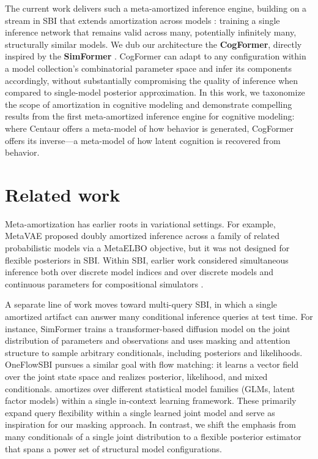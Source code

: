 The current work delivers such a meta-amortized inference engine, building on a stream in SBI that extends amortization across models \citep{chang2025amortized, gloeckler2024all, elsemuller2023sensitivity, schroder2023simultaneous}:
training a single inference network that remains valid across many, potentially infinitely many, structurally similar models.
We dub our architecture the \textbf{CogFormer}, directly inspired by the \textbf{SimFormer} \citep{gloeckler2024all}.
CogFormer can adapt to any configuration within a model collection's combinatorial parameter space and infer its components accordingly, without substantially compromising the quality of inference when compared to single-model posterior approximation.
In this work, we taxonomize the scope of amortization in cognitive modeling and demonstrate compelling results from the first meta-amortized inference engine for cognitive modeling: where Centaur offers a meta-model of how behavior is generated, CogFormer offers its inverse---a meta-model of how latent cognition is recovered from behavior.

\section{Related work}
\label{sec:related}

Meta-amortization has earlier roots in variational settings. For example, MetaVAE \citep{wu2020meta} proposed doubly amortized inference across a family of related probabilistic models via a MetaELBO objective, but it was not designed for flexible posteriors in SBI. Within SBI, earlier work considered simultaneous inference both over discrete model indices \citep{radev2020amortized} and over discrete models and continuous parameters for compositional simulators \citep{schroder2023simultaneous}.

A separate line of work moves toward multi-query SBI, in which a single amortized artifact can answer many conditional inference queries at test time. For instance, SimFormer \citep{gloeckler2024all} trains a transformer-based diffusion model on the joint distribution of parameters and observations and uses masking and attention structure to sample arbitrary conditionals, including posteriors and likelihoods. OneFlowSBI \citep{nautiyal2026oneflowsbi} pursues a similar goal with flow matching: it learns a vector field over the joint state space and realizes posterior, likelihood, and mixed conditionals. \citet{reuter2025can} amortizes over different statistical model families (GLMs, latent factor models) within a single in-context learning framework. These primarily expand query flexibility within a single learned joint model and serve as inspiration for our masking approach. In contrast, we shift the emphasis from many conditionals of a single joint distribution to a flexible posterior estimator that spans a power set of structural model configurations.

